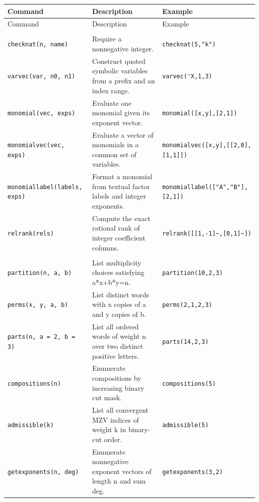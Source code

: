 \documentclass[12pt]{amsproc}
\newcommand{\code}[1]{\nolinkurl{#1}}
\begin{document}
\begin{longtable}{@{}L{0.245\textwidth}L{0.440\textwidth}L{0.245\textwidth}@{}}
\toprule
Command & Description & Example \\
\midrule
\endfirsthead
\toprule
Command & Description & Example \\
\midrule
\endhead
\addlinespace[3pt]\\[2pt]
\code{checknat(n, name)} & Require a nonnegative integer. & \code{checknat(5,"k")} \\
\addlinespace[2pt]
\code{varvec(var, n0, n1)} & Construct quoted symbolic variables from a prefix and an index range. & \code{varvec('X,1,3)} \\
\addlinespace[2pt]
\code{monomial(vec, exps)} & Evaluate one monomial given its exponent vector. & \code{monomial([x,y],[2,1])} \\
\addlinespace[2pt]
\code{monomialvec(vec, exps)} & Evaluate a vector of monomials in a common set of variables. & \code{monomialvec([x,y],[[2,0],[1,1]])} \\
\addlinespace[2pt]
\code{monomiallabel(labels, exps)} & Format a monomial from textual factor labels and integer exponents. & \code{monomiallabel(["A","B"],[2,1])} \\
\addlinespace[2pt]
\code{relrank(rels)} & Compute the exact rational rank of integer coefficient columns. & \code{relrank([[1,-1]~,[0,1]~])} \\
\addlinespace[2pt]
\addlinespace[3pt]\\[2pt]
\code{partition(n, a, b)} & List multiplicity choices satisfying a*x+b*y=n. & \code{partition(10,2,3)} \\
\addlinespace[2pt]
\code{perms(x, y, a, b)} & List distinct words with x copies of a and y copies of b. & \code{perms(2,1,2,3)} \\
\addlinespace[2pt]
\code{parts(n, a = 2, b = 3)} & List all ordered words of weight n over two distinct positive letters. & \code{parts(14,2,3)} \\
\addlinespace[2pt]
\code{compositions(n)} & Enumerate compositions by increasing binary cut mask. & \code{compositions(5)} \\
\addlinespace[2pt]
\code{admissible(k)} & List all convergent MZV indices of weight k in binary-cut order. & \code{admissible(5)} \\
\addlinespace[2pt]
\code{getexponents(n, deg)} & Enumerate nonnegative exponent vectors of length n and sum deg. & \code{getexponents(3,2)} \\

\end{longtable}
\end{document}
